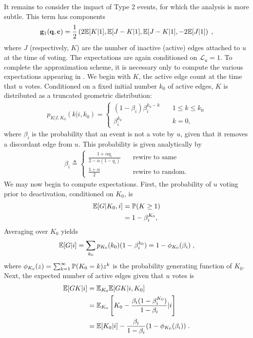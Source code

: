 \documentclass[review, onefignum, onetabnum]{siamart171218}
\begin{document}
		It remains to consider the impact of Type 2 events, for which the analysis is more subtle. 
		This term has components
		\begin{align}
			\mathbf{g}_1(\q, \C) = \frac{1}{2}\left(2\E[K|1], \E[J-K|1], \E[J-K|1], -2\E[J|1]\right)\;, \label{eq:g_components}
		\end{align}
		where $J$ (respectively, $K$) are the number of inactive (active) edges attached to $u$ at the time of voting. 
		The expectations are again conditioned on $\mathcal{L}_u = 1$.  
		To complete the approximation scheme, it is necessary only to compute the various expectations appearing in .
        We begin with $K$, the active edge count at the time that $u$ votes. 
        Conditioned on a fixed initial number $k_0$ of active edges, $K$ is distributed as a truncated geometric distribution: 
        \begin{align*}
        p_{K|I, K_0}(k|i, k_0) = 
        \begin{cases}
          (1-\beta_i)\beta_i^{k_0 - k} &\quad 1\leq k \leq k_0\\ 
          \beta_i^{k_0} &\quad k = 0,
        \end{cases}
        \end{align*}
        where $\beta_i$ is the probability that an event is not a vote by $u$, given that it removes a discordant edge from $u$. 
        This probability is given analytically by 
        \begin{align}
        \beta_i \triangleq 
        \begin{cases}
          \frac{1+\alpha q_i}{2-\alpha(1-q_i)} &\quad \text{rewire to same}\\ 
          \frac{1+\alpha}{2} &\quad \text{rewire to random.} \label{eq:beta}
        \end{cases}
        \end{align}
        We may now begin to compute expectations.
        First, the probability of $u$ voting prior to deactivation, conditioned on $K_0$, is  
        \begin{align*}
        \mathbb{E}[G|K_0, i]  &= \mathbb{P}(K \geq 1) \\ 
                 &= 1-\beta_i^{K_0},
        \end{align*}
        Averaging over $K_0$ yields 
        \begin{align*}
        \mathbb{E}[G|i] = \sum_{k_0}p_{K_0}(k_0)(1-\beta_i^{k_0}) = 1 - \phi_{K_0}(\beta_i)\;,
        \end{align*}
        where $\phi_{K_0}(z) = \sum_{k = 1}^\infty \mathbb{P}(K_0 = k) z^{k}$ is the probability generating function of $K_0$. 
        Next, the expected number of active edges given that $u$ votes is 
        \begin{align*}
        \mathbb{E}[GK|i] &= \mathbb{E}_{K_0}\mathbb{E}[GK|i, K_0] \\ 
                    &= \mathbb{E}_{K_0}\left[K_0 - \frac{\beta_i(1-\beta_i^{K_0})}{1-\beta_i}|i\right] \\ 
                    &= \mathbb{E}[K_0|i] - \frac{\beta_i}{1-\beta_i}(1-\phi_{K_0}(\beta_i))\;.
        \end{align*}
        
\end{document}
